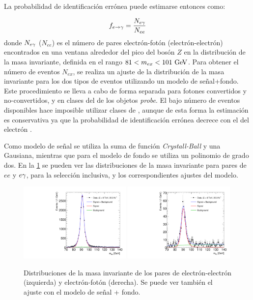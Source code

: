 La probabilidad de identificación errónea {\feg} puede estimarse entonces como:

\begin{equation}\label{eq:efakerate}
  f_{e\rightarrow\gamma} = \frac{N_{e\gamma}}{N_{ee}}
\end{equation}
%
donde $N_{e\gamma}$ ($N_{ee}$) es el número de pares electrón-fotón
(electrón-electrón) encontrados en una ventana alrededor del pico del bosón $Z$ en la distribución de
la masa invariante, definida en el rango $81 < m_{ex} < 101 \gev$. Para obtener
el número de eventos $N_{ex}$, se realiza un ajuste de la distribución de la
masa invariante para los dos tipos de eventos utilizando un modelo de
señal+fondo. Este procedimiento se lleva a cabo de forma separada para fotones
convertidos y no-convertidos, y en clases del {\abseta} de los objetos
\emph{probe}. El bajo número de eventos disponibles hace imposible utilizar
clases de {\pt}, aunque de esta forma la estimación es conservativa ya que la
probabilidad de identificación errónea decrece con el {\pt} del electrón
\cite{Kuhl:1604846}.

Como modelo de señal se utiliza la suma de función \emph{Crystall-Ball} y una
Gausiana, mientras que para el modelo de fondo se utiliza un polinomio de grado
dos. En la \cref{fig:invmass_pairs} se pueden ver las distribuciones de la masa
invariante para pares de $ee$ y $e\gamma$, para la selección inclusiva, y los
correspondientes ajustes del modelo.

\begin{figure}[!htbp]
  \centering

  \includegraphics[width=0.49\textwidth]{figures/Fit_mee_efakes_Data_all}
  \includegraphics[width=0.49\textwidth]{figures/Fit_meg_efakes_Data_all}
  \caption{Distribuciones de la masa invariante de los pares de
    electrón-electrón (izquierda) y electrón-fotón (derecha). Se puede ver también el ajuste
    con el modelo de señal + fondo.}
  \label{fig:invmass_pairs}

\end{figure}

